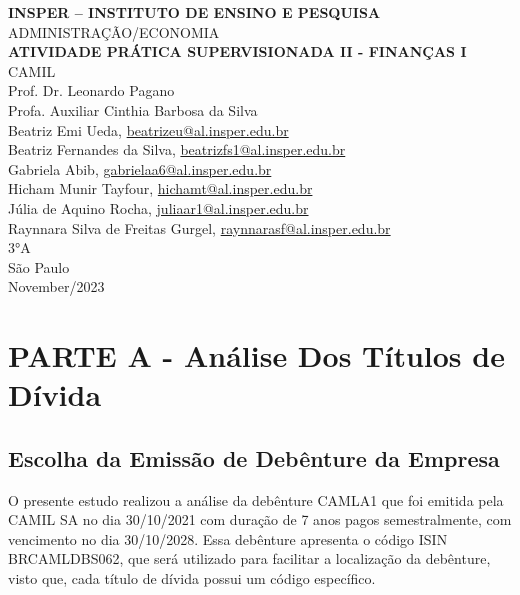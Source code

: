 \documentclass[a4paper,12pt]{article}[abntex2]
\begin{document}
\begin{titlepage}
    \centering
    \vspace*{1cm}
    \Large\textbf{INSPER – INSTITUTO DE ENSINO E PESQUISA}\\
    \Large ADMINISTRAÇÃO/ECONOMIA\\
    \vspace{1.5cm}
    \Large\textbf{ATIVIDADE PRÁTICA SUPERVISIONADA II - FINANÇAS I}\\
    \vspace{1.5cm}
    \large CAMIL\\
    Prof. Dr. Leonardo Pagano\\
    Profa. Auxiliar Cinthia Barbosa da Silva\\
    \vfill
    \normalsize
    Beatriz Emi Ueda, \href{mailto:beatrizeu@al.insper.edu.br}{beatrizeu@al.insper.edu.br}\\
    Beatriz Fernandes da Silva, \href{mailto:beatrizfs1@al.insper.edu.br}{beatrizfs1@al.insper.edu.br}\\
    Gabriela Abib, \href{mailto:gabrielaa6@al.insper.edu.br}{gabrielaa6@al.insper.edu.br}\\
    Hicham Munir Tayfour, \href{mailto:hichamt@al.insper.edu.br}{hichamt@al.insper.edu.br}\\
    Júlia de Aquino Rocha, \href{mailto:juliaar1@al.insper.edu.br}{juliaar1@al.insper.edu.br}\\
    Raynnara Silva de Freitas Gurgel, \href{mailto:raynnarasf@al.insper.edu.br}{raynnarasf@al.insper.edu.br}\\
    3°A\\
    \vfill
    São Paulo\\
    November/2023
\end{titlepage}

\newpage
\tableofcontents
\thispagestyle{empty} %
\newpage
\setcounter{page}{1} %
\justify
\onehalfspacing

\pagestyle{fancy}
\fancyhf{}
\rhead{\thepage}

\section{\textbf{PARTE A - Análise Dos Títulos de Dívida}}
\subsection{\textbf{Escolha da Emissão de Debênture da Empresa}}
O presente estudo realizou a análise da debênture CAMLA1 que foi emitida pela CAMIL SA no dia 30/10/2021 com duração de 7 anos pagos semestralmente, com vencimento no dia 30/10/2028. Essa debênture apresenta o código ISIN BRCAMLDBS062, que será utilizado para facilitar a localização da debênture, visto que, cada título de dívida possui um código específico.
\end{document}
